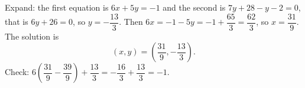 Expand: the first equation is $6x+5y=-1$ and the second is $7y+28-y-2=0$, that is $6y+26=0$, so $y=-\dfrac{13}{3}$. Then $6x=-1-5y=-1+\dfrac{65}{3}=\dfrac{62}{3}$, so $x=\dfrac{31}{9}$. The solution is
\[
\boxed{(x,y)=\left(\dfrac{31}{9},-\dfrac{13}{3}\right)}.
\]
Check: $6\left(\dfrac{31}{9}-\dfrac{39}{9}\right)+\dfrac{13}{3}=-\dfrac{16}{3}+\dfrac{13}{3}=-1$.
